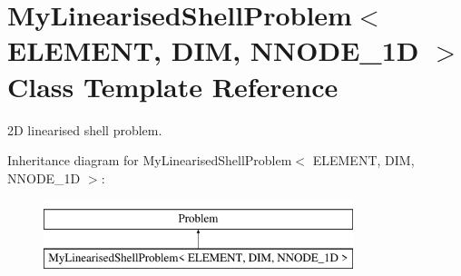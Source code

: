 \hypertarget{classMyLinearisedShellProblem}{}\section{My\+Linearised\+Shell\+Problem$<$ E\+L\+E\+M\+E\+NT, D\+IM, N\+N\+O\+D\+E\+\_\+1D $>$ Class Template Reference}
\label{classMyLinearisedShellProblem}


2D linearised shell problem.  


Inheritance diagram for My\+Linearised\+Shell\+Problem$<$ E\+L\+E\+M\+E\+NT, D\+IM, N\+N\+O\+D\+E\+\_\+1D $>$\+:\begin{figure}[H]
\begin{center}
\leavevmode
\includegraphics[height=2.000000cm]{classMyLinearisedShellProblem}
\end{center}
\end{figure}
